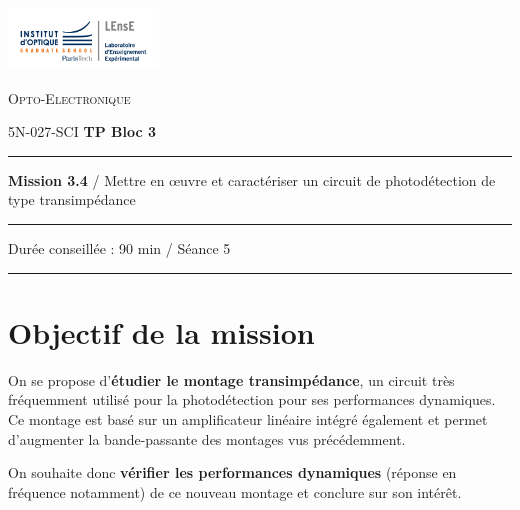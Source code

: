 \newpage
\pagestyle{empty}

\begin{minipage}[c]{.25\linewidth}
	\includegraphics[width=4cm]{images/Logo-LEnsE.png}
\end{minipage} \hfill
\begin{minipage}[c]{.4\linewidth}

\begin{center}
\vspace{0.3cm}
{\Large \textsc{Opto-Electronique}}

\medskip

5N-027-SCI \qquad \textbf{\Large TP Bloc 3}

\end{center}
\end{minipage}\hfill

\vspace{0.5cm}

\noindent \rule{\linewidth}{1pt}

{\noindent\Large \textbf{Mission 3.4} / Mettre en \oe{}uvre et caractériser un circuit de photodétection de type transimpédance} 

\vspace{-0.5cm}

\begin{center}
\noindent \rule{\linewidth}{1pt}

Durée conseillée : 90 min / Séance 5

\vspace{-0.2cm}
\noindent \rule{\linewidth}{1pt}
\end{center}

\section{Objectif de la mission}
\label{mission34}

On se propose d'\textbf{étudier le montage transimpédance}, un circuit très fréquemment utilisé pour la photodétection pour ses performances dynamiques. Ce montage est basé sur un amplificateur linéaire intégré également et permet d'augmenter la bande-passante des montages vus précédemment.

On souhaite donc \textbf{vérifier les performances dynamiques} (réponse en fréquence notamment) de ce nouveau montage et conclure sur son intérêt.

